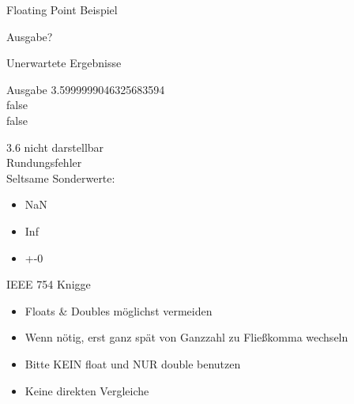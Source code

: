 \begin{frame}{Floating Point Beispiel}
	\lstset{
		language=C++,
		tabsize=2
	}
	
	Ausgabe?
\end{frame}

\begin{frame}{Unerwartete Ergebnisse}
	\begin{exampleblock}{Ausgabe}
		3.5999999046325683594 \\
		false\\
		false
	\end{exampleblock}
	3.6 nicht darstellbar \\
	Rundungsfehler \\
	Seltsame Sonderwerte:
	\begin{itemize}
		\item NaN
		\item Inf
		\item +-0
	\end{itemize}
\end{frame}

\begin{frame}{IEEE 754 Knigge}
	\begin{itemize}
		\item Floats \& Doubles möglichst vermeiden
		\item Wenn nötig, erst ganz spät von Ganzzahl zu Fließkomma wechseln
		\item Bitte KEIN float und NUR double benutzen
		\item Keine direkten Vergleiche
	\end{itemize}

\end{frame}
